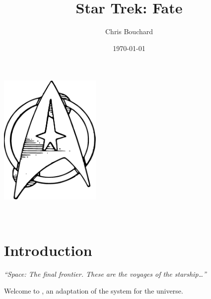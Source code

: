 \documentclass[12pt,titlepage,openany]{book}
\title{Star Trek: Fate}
\author{Chris Bouchard}
\date{\yyyymmdddate\today}
\begin{document}
\begin{titlepage}
    \vspace*{0.5in}
    \begin{center}
        \includegraphics[height=2.5in]{img/CommBadge.eps}\\
        \vspace*{0.4in}
        {\fontsize{0.75in}{1em}\selectfont\STFLogo}\\
        \vspace*{\fill}
        {\fontsize{0.3in}{1em}\selectfont{}\theauthor}\\
        \vspace*{0.2in}
        {\fontsize{0.25in}{1em}\selectfont{}\thedate}
    \end{center}
\end{titlepage}

\cleardoublepage

\begin{center}
    \parbox{0.85\linewidth}{}
\end{center}
\cleardoublepage

\tableofcontents
\cleardoublepage




\chapter{Introduction}\label{chap:intro}

\begin{center}
\textit{``Space: The final frontier. These are the voyages of the starship\ldots''}
\end{center}

\vspace{1em}

\noindent
Welcome to \StarTrekFate{}, an adaptation of the \FateCore{} system for the
\StarTrek{} universe.
\end{document}
